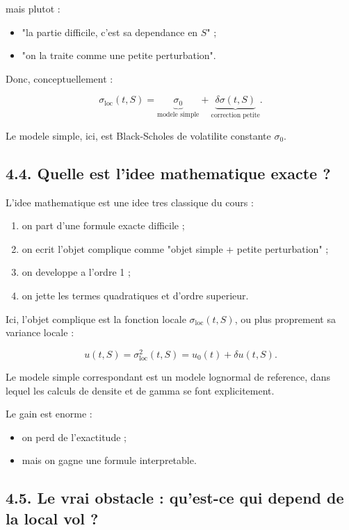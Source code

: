 \documentclass[11pt,a4paper]{article}
\begin{document}
mais plutot :

\begin{itemize}
\item "la partie difficile, c'est sa dependance en \(S\)" ;
\item "on la traite comme une petite perturbation".
\end{itemize}

Donc, conceptuellement :

\[
\sigma_{\mathrm{loc}}(t,S)
=
\underbrace{\sigma_0}_{\text{modele simple}}
+
\underbrace{\delta\sigma(t,S)}_{\text{correction petite}}.
\]

Le modele simple, ici, est Black-Scholes de volatilite constante \(\sigma_0\).

\subsection{4.4. Quelle est l'idee mathematique exacte ?}

L'idee mathematique est une idee tres classique du cours :

\begin{enumerate}
\item on part d'une formule exacte difficile ;
\item on ecrit l'objet complique comme "objet simple + petite perturbation" ;
\item on developpe a l'ordre 1 ;
\item on jette les termes quadratiques et d'ordre superieur.
\end{enumerate}

Ici, l'objet complique est la fonction locale \(\sigma_{\mathrm{loc}}(t,S)\), ou plus proprement sa variance locale :

\[
u(t,S)=\sigma_{\mathrm{loc}}^2(t,S)=u_0(t)+\delta u(t,S).
\]

Le modele simple correspondant est un modele lognormal de reference, dans lequel les calculs de densite et de gamma se font explicitement.

Le gain est enorme :

\begin{itemize}
\item on perd de l'exactitude ;
\item mais on gagne une formule interpretable.
\end{itemize}

\subsection{4.5. Le vrai obstacle : qu'est-ce qui depend de la local vol ?}
\end{document}
